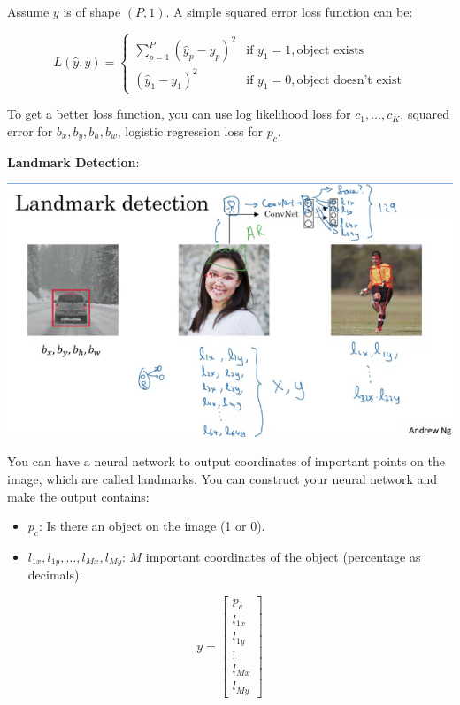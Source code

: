 \documentclass{article}
\begin{document}
\noindent Assume \(y\) is of shape \((P, 1)\). A simple squared error loss function can be:

\[
L(\hat{y}, y) =
\begin{cases}
\sum_{p = 1}^{P} (\hat{y}_{p} - y_{p})^{2} & \text{if } y_{1} = 1, \text{object exists}\\
(\hat{y}_{1} - y_{1})^{2} & \text{if } y_{1} = 0, \text{object doesn't exist}
\end{cases}
\]

\noindent To get a better loss function, you can use log likelihood loss for \(c_{1}, \dots, c_{K}\), squared error for \(b_{x}, b_{y}, b_{h}, b_{w}\), logistic regression loss for \(p_{c}\).

\bigskip

\noindent \textbf{Landmark Detection}:

\begin{center}
\includegraphics[scale=0.5]{./images/landmark_detection.png}
\end{center}

\noindent You can have a neural network to output coordinates of important points on the image, which are called landmarks. You can construct your neural network and make the output contains:

\begin{itemize}
    \item \(p_{c}\): Is there an object on the image (1 or 0).
    \item \(l_{1x}, l_{1y}, \dots, l_{Mx}, l_{My}\): \(M\) important coordinates of the object (percentage as decimals).
\end{itemize}

\[
y =
\begin{bmatrix}
p_{c}\\
l_{1x}\\
l_{1y}\\
\vdots\\
l_{Mx}\\
l_{My}
\end{bmatrix}
\]
\end{document}
